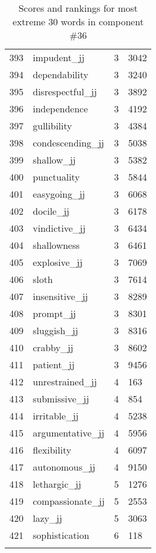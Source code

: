 \begin{longtable}[!htbp]{| rlr@{.}l |}
    393 & impudent\_jj & 3 & 3042 \\
    394 & dependability & 3 & 3240 \\
    395 & disrespectful\_jj & 3 & 3892 \\
    396 & independence & 3 & 4192 \\
    397 & gullibility & 3 & 4384 \\
    398 & condescending\_jj & 3 & 5038 \\
    399 & shallow\_jj & 3 & 5382 \\
    400 & punctuality & 3 & 5844 \\
    401 & easygoing\_jj & 3 & 6068 \\
    402 & docile\_jj & 3 & 6178 \\
    403 & vindictive\_jj & 3 & 6434 \\
    404 & shallowness & 3 & 6461 \\
    405 & explosive\_jj & 3 & 7069 \\
    406 & sloth & 3 & 7614 \\
    407 & insensitive\_jj & 3 & 8289 \\
    408 & prompt\_jj & 3 & 8301 \\
    409 & sluggish\_jj & 3 & 8316 \\
    410 & crabby\_jj & 3 & 8602 \\
    411 & patient\_jj & 3 & 9456 \\
    412 & unrestrained\_jj & 4 & 163 \\
    413 & submissive\_jj & 4 & 854 \\
    414 & irritable\_jj & 4 & 5238 \\
    415 & argumentative\_jj & 4 & 5956 \\
    416 & flexibility & 4 & 6097 \\
    417 & autonomous\_jj & 4 & 9150 \\
    418 & lethargic\_jj & 5 & 1276 \\
    419 & compassionate\_jj & 5 & 2553 \\
    420 & lazy\_jj & 5 & 3063 \\
    421 & sophistication & 6 & 118 \\
    \hline
    \caption{Scores and rankings for most extreme 30 words in component \#36} \\
\end{longtable}
